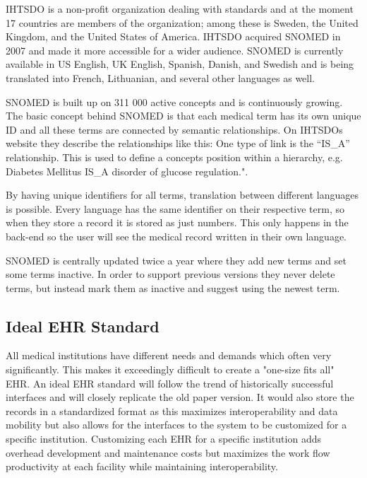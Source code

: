 \documentclass[14pt]{article}
\begin{document}
\gls{IHTSDO} is a non-profit organization dealing with standards and at the moment 17 countries are members of the organization; among these is Sweden, the United Kingdom, and the United States of America. \gls{IHTSDO} acquired \gls{SNOMED} in 2007 and made it more accessible for a wider audience. \gls{SNOMED} is currently available in US English, UK English, Spanish, Danish, and Swedish and is being translated into French, Lithuanian, and several other languages as well\cite{ihtsdolang}.

\gls{SNOMED} is built up on 311 000 active concepts and is continuously growing. The basic concept behind \gls{SNOMED} is that each medical term has its own unique ID and all these terms are connected by semantic relationships. On \gls{IHTSDO}s website they describe the relationships like this: One type of link is the “IS\_A” relationship. This is used to define a concepts position within a hierarchy, e.g. Diabetes Mellitus IS\_A disorder of glucose regulation."\cite{ihtsdocomp}. 

By having unique identifiers for all terms, translation between different languages is possible. Every language has the same identifier on their respective term, so when they store a record it is stored as just numbers. This only happens in the back-end so the user will see the medical record written in their own language.

\gls{SNOMED} is centrally updated twice a year where they add new terms and set some terms inactive. In order to support previous versions they never delete terms, but instead mark them as inactive and suggest using the newest term.%

\subsection{Ideal EHR Standard}
All medical institutions have different needs and demands which often very significantly. This makes it exceedingly difficult to create a "one-size fits all" \gls{EHR}. An ideal \gls{EHR} standard will follow the trend of historically successful interfaces and will closely replicate the old paper version. It would also store the records in a standardized format as this maximizes interoperability and data mobility but also allows for the interfaces to the system to be customized for a specific institution. Customizing each \gls{EHR} for a specific institution adds overhead development and maintenance costs but maximizes the work flow productivity at each facility while maintaining interoperability. 
\end{document}
